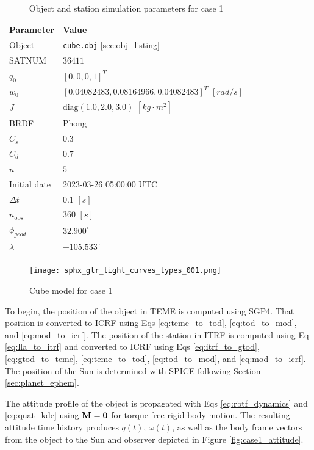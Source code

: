 \begin{table}[]
  \centering
  \begin{tabular}{|l|l|}
  \hline
  \textbf{Parameter} & \textbf{Value} \\ \hline
  Object & \texttt{cube.obj} \ref{sec:obj_listing} \\ \hline
  SATNUM & $36411$ \\ \hline
  $q_0$ & $\left[ 0, 0, 0, 1 \right]^T$ \\ \hline
  $w_0$ & $\left[ 0.04082483, 0.08164966, 0.04082483 \right]^T$ $[rad/s]$ \\ \hline
  $J$ & $\mathrm{diag}\left( 1.0, 2.0, 3.0 \right)$ $\left[ kg \cdot m^2 \right]$ \\ \hline
  BRDF & Phong \\ \hline
  $C_s$ & $0.3$ \\ \hline
  $C_d$ & $0.7$ \\ \hline
  $n$ & $5$ \\ \hline
  Initial date & 2023-03-26 05:00:00 UTC \\ \hline
  $\Delta t$ & $0.1$ $[s]$ \\ \hline
  $n_\mathrm{obs}$ & $360$ $[s]$ \\ \hline
  $\phi_{geod}$ & $32.900^\circ$ \\ \hline
  $\lambda$ & $-105.533^\circ$ \\ \hline
  \end{tabular}
  \caption{Object and station simulation parameters for case 1}
  \label{tb:case1_obj_props}
\end{table}

\graphicspath{{/Users/liamrobinson/Documents/PyLightCurves/docs/build/html/_images}}
\begin{figure}[!htb]
  \centering
  \texttt{[image: sphx\_glr\_light\_curves\_types\_001.png]}
  \caption{Cube model for case 1}
  \label{fig:case1_obj}
\end{figure}

To begin, the position of the object in TEME is computed using SGP4. That position is converted to ICRF using Eqs \ref{eq:teme_to_tod}, \ref{eq:tod_to_mod}, and \ref{eq:mod_to_icrf}. The position of the station in ITRF is computed using Eq \ref{eq:lla_to_itrf} and converted to ICRF using Eqs \ref{eq:itrf_to_gtod}, \ref{eq:gtod_to_teme}, \ref{eq:teme_to_tod}, \ref{eq:tod_to_mod}, and \ref{eq:mod_to_icrf}. The position of the Sun is determined with SPICE following Section \ref{sec:planet_ephem}. 

The attitude profile of the object is propagated with Eqs \ref{eq:rbtf_dynamics} and \ref{eq:quat_kde} using $\mathbf{M}=\mathbf{0}$ for torque free rigid body motion. The resulting attitude time history produces $q(t)$, $\omega(t)$, as well as the body frame vectors from the object to the Sun and observer depicted in Figure \ref{fig:case1_attitude}.

